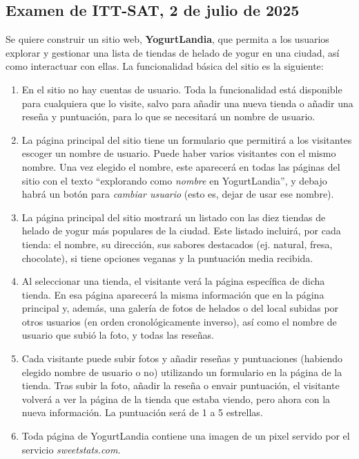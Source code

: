 \subsection{Examen de ITT-SAT, 2 de julio de 2025}

Se quiere construir un sitio web, \textbf{YogurtLandia}, que permita a los usuarios explorar y gestionar una lista de tiendas de helado de yogur en una ciudad, así como interactuar con ellas. La funcionalidad básica del sitio es la siguiente:

\begin{enumerate}
    \item En el sitio no hay cuentas de usuario. Toda la funcionalidad está disponible para cualquiera que lo visite, salvo para añadir una nueva tienda o añadir una reseña y puntuación, para lo que se necesitará un nombre de usuario.
    \item La página principal del sitio tiene un formulario que permitirá a los visitantes escoger un nombre de usuario. Puede haber varios visitantes con el mismo nombre. Una vez elegido el nombre, este aparecerá en todas las páginas del sitio con el texto ``explorando como \emph{nombre} en YogurtLandia'', y debajo habrá un botón para \emph{cambiar usuario} (esto es, dejar de usar ese nombre).
    \item La página principal del sitio mostrará un listado con las diez tiendas de helado de yogur más populares de la ciudad. Este listado incluirá, por cada tienda: el nombre, su dirección, sus sabores destacados (ej. natural, fresa, chocolate), si tiene opciones veganas y la puntuación media recibida.
    \item Al seleccionar una tienda, el visitante verá la página específica de dicha tienda. En esa página aparecerá la misma información que en la página principal y, además, una galería de fotos de helados o del local subidas por otros usuarios (en orden cronológicamente inverso), así como el nombre de usuario que subió la foto, y todas las reseñas.
    \item Cada visitante puede subir fotos y añadir reseñas y puntuaciones (habiendo elegido nombre de usuario o no) utilizando un formulario en la página de la tienda. Tras subir la foto, añadir la reseña o envair puntuación, el visitante volverá a ver la página de la tienda que estaba viendo, pero ahora con la nueva información. La puntuación será de 1 a 5 estrellas.
    \item Toda página de YogurtLandia contiene una imagen de un pixel servido por el servicio \emph{sweetstats.com}.
\end{enumerate}


